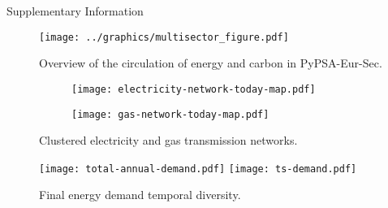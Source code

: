 
\Large{Supplementary Information}
\label{sec:si}
\normalsize

\begin{figure}[ht!]
    \centering
    \texttt{[image: ../graphics/multisector\_figure.pdf]}
    \caption{Overview of the circulation of energy and carbon in PyPSA-Eur-Sec.}
    \label{fig:multisector}
\end{figure}

\begin{figure}[ht!]
    \centering
\begin{subfigure}[t]{0.48\textwidth}
    \centering
    \texttt{[image: electricity-network-today-map.pdf]}
\end{subfigure}
\begin{subfigure}[t]{0.48\textwidth}
    \centering
    \texttt{[image: gas-network-today-map.pdf]}
\end{subfigure}
\caption{Clustered electricity and gas transmission networks.}
\label{fig:clustered-networks}
\end{figure}

\begin{figure}[ht!]
    \centering
    \texttt{[image: total-annual-demand.pdf]}
    \texttt{[image: ts-demand.pdf]}
    \caption{Final energy demand temporal diversity.}
    \label{fig:demand-time}
\end{figure}

